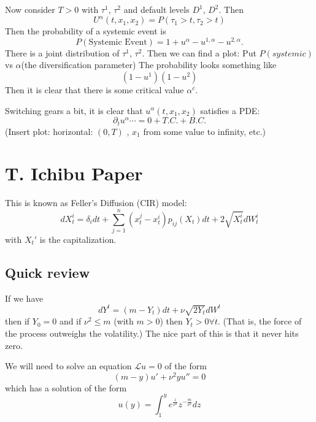 Now consider $T>0$ with $\tau^1$, $\tau^2$ and default levels $D^1$, $D^2$. Then
\begin{equation}
	U^\alpha (t, x_1, x_2) = P(\tau_1> t, \tau_2 > t)
\end{equation}
Then the probability of a systemic event is
\begin{equation}
	P(\text{Systemic Event}) = 1+u^\alpha - u^{1,\alpha} - u^{2,\alpha}.
\end{equation}
There is a joint distribution of $\tau^1$, $\tau^2$. 
Then we can find a plot: Put $P(systemic)$ vs $\alpha$(the diversification parameter) The probability looks something like
\begin{equation}
	(1-u^1)(1-u^2)
\end{equation}
Then it is clear that there is some critical value $\alpha^c$.

Switching gears a bit, it is clear that $u^\alpha(t,x_1,x_2)$ satisfies a PDE:
\begin{equation}
	\partial_t u^\alpha  \cdots = 0 + T.C.  + B.C.
\end{equation}
(Insert plot: horizontal: $(0,T)$ , $x_1$ from some value to infinity, etc.)

\section{T. Ichibu Paper}
This is known as Feller's Diffusion (CIR) model:
\begin{equation}
	dX_t^i = \delta_i dt + \sum_{j=1}^n (x_t^j - x_t^i) p_{ij}(X_t)dt + 2\sqrt{X_t^i} dW^i_t
\end{equation}
with $X_t'$ is the capitalization.

\subsection{Quick review}
If we have
\begin{equation}
	dY^t = (m-Y_t)dt + \nu \sqrt{2 Y_t} dW^t
\end{equation}
then if $Y_0=0$ and if $\nu^2 \leq m$ (with $m>0$) then $Y_t>0 \forall t$.
(That is, the force of the process outweighs the volatility.)
The nice part of this is that it never hits zero.

We will need to solve an equation $\mathcal{L}u = 0$ of the form
\begin{equation}
	(m-y)u' + \nu^2 y u'' = 0
\end{equation}
which has a solution of the form
\begin{equation}
	u(y) = \int_1^y e^{\frac{z}{\nu^2}} z^{-\frac{m}{\nu^2}}dz
\end{equation}

